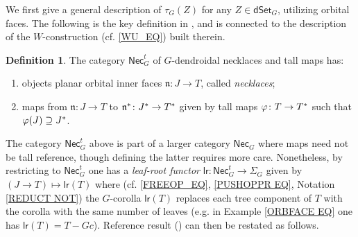 \documentclass[a4paper,10pt
,draft
]{article}%
\numberwithin{equation}{section}
\numberwithin{figure}{section}
\theoremstyle{definition} %
\newtheorem{definition}[equation]{Definition}%
\newtheorem{example}[equation]{Example}%
\newcommand{\dSet}{\mathsf{dSet}}
\newcommand{\1}{\ensuremath{\mathbbm 1}}%
\begin{document}
	


We first give a general description of $\tau_G(Z)$ for any $Z \in \dSet_G$,
utilizing orbital faces.
The following is the key definition in \cite{BP_WCONS},
and is connected to the description of the $W$-construction
(cf. \eqref{WU_EQ}) built therein.

\begin{definition}\label{DENDNECK DEF}
	The category $\mathsf{Nec}^t_G$ of $G$-dendroidal necklaces and tall maps has:
	\begin{enumerate}
		\item objects planar orbital inner faces 
		$\mathfrak{n} \colon J \to T$, 
		called \emph{necklaces};
		\item maps from 
		$\mathfrak{n} \colon J \to T$ to
		$\mathfrak{n}^{\**} \colon J^{\**} \to T^{\**}$
		given by tall maps $\varphi \colon T \to T^{\**}$
		such that $\varphi(J) \supseteq J^{\**}$.
	\end{enumerate}
\end{definition}

The category $\mathsf{Nec}^t_G$ above is part of a larger category 
$\mathsf{Nec}_G$ where maps need not be tall 
{\color{red} reference}, though defining the latter requires more care.
Nonetheless, by restricting to 
$\mathsf{Nec}^t_G$
one has a \emph{leaf-root functor}
$\mathsf{lr} \colon \mathsf{Nec}^t_G \to \Sigma_G$
given by $(J \to T) \mapsto \mathsf{lr}(T)$
where (cf. \eqref{FREEOP_EQ}, \eqref{PUSHOPPR EQ}, Notation \ref{REDUCT NOT})
the $G$-corolla
$\mathsf{lr}(T)$ replaces each tree component of $T$
with the corolla with the same number of leaves
(e.g. in Example \eqref{ORBFACE EQ}
one has $\mathsf{lr}(T) = T-Gc$).
{\color{red}Reference result 
	(\cite[Rem. \ref{W-GTAUFUNEX REM}]{BP_WCONS})}
can then be restated as follows.
\end{document}
